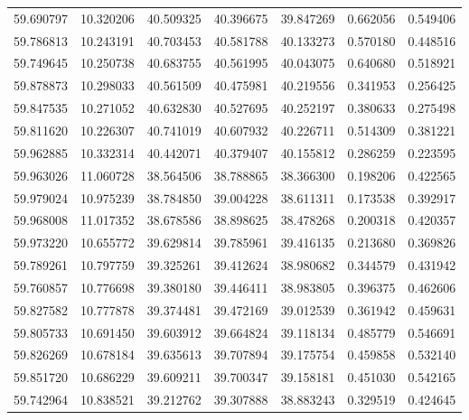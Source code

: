 \begin{tabular}{rrrrrrr}
 59.690797 &  10.320206 &         40.509325 &         40.396675 &         39.847269 &  0.662056 &  0.549406 \\
 59.786813 &  10.243191 &         40.703453 &         40.581788 &         40.133273 &  0.570180 &  0.448516 \\
 59.749645 &  10.250738 &         40.683755 &         40.561995 &         40.043075 &  0.640680 &  0.518921 \\
 59.878873 &  10.298033 &         40.561509 &         40.475981 &         40.219556 &  0.341953 &  0.256425 \\
 59.847535 &  10.271052 &         40.632830 &         40.527695 &         40.252197 &  0.380633 &  0.275498 \\
 59.811620 &  10.226307 &         40.741019 &         40.607932 &         40.226711 &  0.514309 &  0.381221 \\
 59.962885 &  10.332314 &         40.442071 &         40.379407 &         40.155812 &  0.286259 &  0.223595 \\
 59.963026 &  11.060728 &         38.564506 &         38.788865 &         38.366300 &  0.198206 &  0.422565 \\
 59.979024 &  10.975239 &         38.784850 &         39.004228 &         38.611311 &  0.173538 &  0.392917 \\
 59.968008 &  11.017352 &         38.678586 &         38.898625 &         38.478268 &  0.200318 &  0.420357 \\
 59.973220 &  10.655772 &         39.629814 &         39.785961 &         39.416135 &  0.213680 &  0.369826 \\
 59.789261 &  10.797759 &         39.325261 &         39.412624 &         38.980682 &  0.344579 &  0.431942 \\
 59.760857 &  10.776698 &         39.380180 &         39.446411 &         38.983805 &  0.396375 &  0.462606 \\
 59.827582 &  10.777878 &         39.374481 &         39.472169 &         39.012539 &  0.361942 &  0.459631 \\
 59.805733 &  10.691450 &         39.603912 &         39.664824 &         39.118134 &  0.485779 &  0.546691 \\
 59.826269 &  10.678184 &         39.635613 &         39.707894 &         39.175754 &  0.459858 &  0.532140 \\
 59.851720 &  10.686229 &         39.609211 &         39.700347 &         39.158181 &  0.451030 &  0.542165 \\
 59.742964 &  10.838521 &         39.212762 &         39.307888 &         38.883243 &  0.329519 &  0.424645 \\

\end{tabular}
